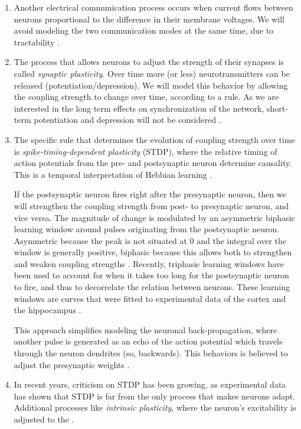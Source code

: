 \begin{enumerate}
\item Another electrical communication process occurs when current flows between neurons proportional to the difference in their membrane voltages. We will avoid modeling the two communication modes at the same time, due to tractability \cite{Martens2020}. 

\item The process that allows neurons to adjust the strength of their synapses is called \textsl{synaptic plasticity}. Over time more (or less) neurotransmitters can be released (potentiation/depression). We will model this behavior by allowing the coupling strength to change over time, according to a rule. As we are interested in the long term effects on synchronization of the network, short-term potentiation and depression will not be considered \cite{MathFoundationNeuroscience}.

\item The specific rule that determines the evolution of coupling strength over time is \textsl{spike-timing-dependent plasticity} (STDP), where the relative timing of action potentials from the pre- and postsynaptic neuron determine causality. This is a temporal interpretation of Hebbian learning \cite{Kempter1999, Gerstner2002}. 

If the postsynaptic neuron fires right after the presynaptic neuron, then we will strengthen the coupling strength from post- to presynaptic neuron, and vice versa. The magnitude of change is modulated by an asymmetric biphasic learning window around pulses originating from the postsynaptic neuron. Asymmetric because the peak is not situated at 0 and the integral over the window is generally positive, biphasic because this allows both to strengthen and weaken coupling strengths \cite{Gerstner2002}. Recently, triphasic learning windows have been used to account for when it takes too long for the postsynaptic neuron to fire, and thus to decorrelate the relation between neurons. These learning windows are curves that were fitted to experimental data of the cortex and the hippocampus \cite{ChrolCannon2014}.

This approach simplifies modeling the neuronal back-propagation, where another pulse is generated as an echo of the action potential which travels through the neuron dendrites (so, backwards). This behaviors is believed to adjust the presynaptic weights \cite{Gerstner2002}.


\item In recent years, criticism on STDP has been growing, as experimental data has shown that STDP is far from the only process that makes neurons adapt. Additional processes like \textsl{intrinsic plasticity}, where the neuron's excitability is adjusted to the  \cite{ChrolCannon2014}.


\end{enumerate}
